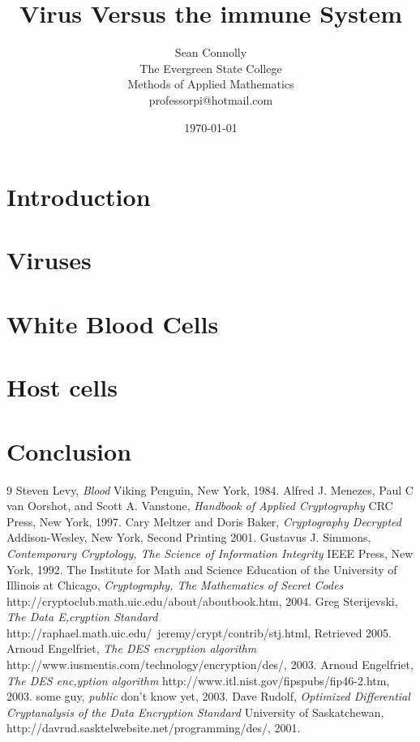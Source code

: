 \documentclass[12pt]{report}
\begin{document}
\title{Virus Versus the immune System}
\author{Sean Connolly\\
The Evergreen State College\\
Methods of Applied Mathematics\\
professorpi@hotmail.com}
\date{\today}
\maketitle

\section*{Introduction}

\section*{Viruses}

\section*{White Blood Cells}

\section*{Host cells}

\section*{Conclusion}

\begin{thebibliography} {9}
	  Steven Levy,
	  \emph{Blood}
	  Viking Penguin, New York,
	  1984.
	  Alfred J. Menezes, Paul C van Oorshot, and Scott A. Vanstone,
	  \emph{Handbook of Applied Cryptography}
	  CRC Press, New York,
	  1997.
	  Cary Meltzer and Doris Baker,
	  \emph{Cryptography Decrypted}
	  Addison-Wesley, New York,
	  Second Printing
	  2001.
	  Gustavus J. Simmons,
	  \emph{Contemporary Cryptology, The Science of Information Integrity}
	  IEEE Press, New York,
	  1992.
	  The Institute for Math and Science Education of the University of Illinois at Chicago,
	  \emph{Cryptography, The Mathematics of Secret Codes}
	  http://cryptoclub.math.uic.edu/about/aboutbook.htm,
	  2004.
	  Greg Sterijevski,
	  \emph{The Data E,cryption Standard}
	  http://raphael.math.uic.edu/~jeremy/crypt/contrib/stj.html,
	  Retrieved 2005.
	  Arnoud Engelfriet,
	  \emph{The DES encryption algorithm}
	  http://www.iusmentis.com/technology/encryption/des/,
	  2003.
	  Arnoud Engelfriet,
	  \emph{The DES enc,yption algorithm}
	  http://www.itl.nist.gov/fipspubs/fip46-2.htm,
	  2003.
	  some guy,
	  \emph{public}
	  don't know yet,
	  2003.
	  Dave Rudolf,
	  \emph{Optimized Differential Cryptanalysis of the Data Encryption Standard}
	  University of Saskatchewan, http://davrud.sasktelwebsite.net/programming/des/,
	  2001.
\end{thebibliography}
\end{document}
